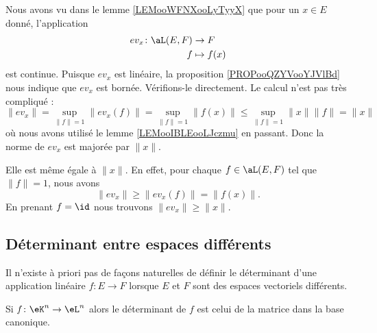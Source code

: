 \begin{example}     \label{EXooTQPEooRRdddt}
	Nous avons vu dans le lemme \ref{LEMooWFNXooLyTyyX} que pour un \( x\in E\) donné, l'application
	\begin{equation}
		\begin{aligned}
			ev_x\colon \aL(E,F) & \to F        \\
			f                   & \mapsto f(x)
		\end{aligned}
	\end{equation}
	est continue. Puisque \( ev_x\) est linéaire, la proposition \ref{PROPooQZYVooYJVlBd} nous indique que \( ev_x\) est bornée. Vérifions-le directement. Le calcul n'est pas très compliqué :
	\begin{equation}
		\| ev_x \|=\sup_{\| f \|=1}\| ev_x(f) \|=\sup_{\| f \|=1}\| f(x) \|\leq \sup_{\| f \|=1}\| x \|\| f \|=\| x \|
	\end{equation}
	où nous avons utilisé le lemme \ref{LEMooIBLEooLJczmu} en passant. Donc la norme de \( ev_x\) est majorée par \( \| x \|\).

	Elle est même égale à \( \| x \|\). En effet, pour chaque \( f\in \aL(E,F)\) tel que \(  \| f \|=1\), nous avons
	\begin{equation}
		\| ev_x \|\geq \| ev_x(f) \|=\| f(x) \|.
	\end{equation}
	En prenant \( f=\id\) nous trouvons \(  \| ev_x \|\geq \| x \|  \).
\end{example}


\subsection{Déterminant entre espaces différents}

Il n'existe à priori pas de façons naturelles de définir le déterminant d'une application linéaire \(f \colon E\to F  \) lorsque \( E\) et \( F\) sont des espaces vectoriels différents\cite{BIBooJLVVooEdGshG}.

\begin{definition}	\label{DEFooJEOMooEXvnUU}
	Si \(f \colon \eK^n\to \eL^n  \) alors le déterminant de \( f\) est celui de la matrice dans la base canonique.
\end{definition}


